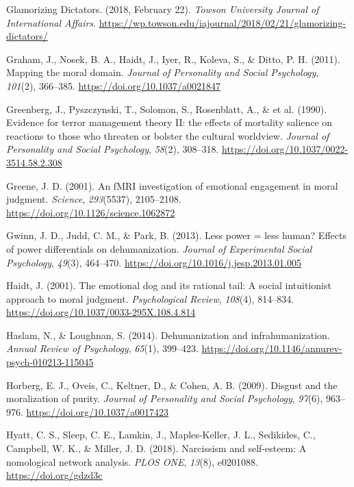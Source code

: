 \documentclass[
  donotrepeattitle,doc, 12pt, a4paper,floatsintext]{apa7}
\newlength{\cslhangindent}
\newlength{\cslentryspacingunit} %
\newenvironment{CSLReferences}[2] %
 {%
  \setlength{\parindent}{0pt}
  \ifodd #1
  \let\oldpar\par
  \def\par{\hangindent=\cslhangindent\oldpar}
  \fi
  \setlength{\parskip}{#2\cslentryspacingunit}
 }%
 {}
\begin{document}
\begin{CSLReferences}{1}{0}
\leavevmode{}%
Glamorizing Dictators. (2018, February 22). \emph{Towson University Journal of International Affairs}. \url{https://wp.towson.edu/iajournal/2018/02/21/glamorizing-dictators/}

\leavevmode{}%
Graham, J., Nosek, B. A., Haidt, J., Iyer, R., Koleva, S., \& Ditto, P. H. (2011). Mapping the moral domain. \emph{Journal of Personality and Social Psychology}, \emph{101}(2), 366--385. \url{https://doi.org/10.1037/a0021847}

\leavevmode{}%
Greenberg, J., Pyszczynski, T., Solomon, S., Rosenblatt, A., \& et al. (1990). Evidence for terror management theory II: the effects of mortality salience on reactions to those who threaten or bolster the cultural worldview. \emph{Journal of Personality and Social Psychology}, \emph{58}(2), 308--318. \url{https://doi.org/10.1037/0022-3514.58.2.308}

\leavevmode{}%
Greene, J. D. (2001). An fMRI investigation of emotional engagement in moral judgment. \emph{Science}, \emph{293}(5537), 2105--2108. \url{https://doi.org/10.1126/science.1062872}

\leavevmode{}%
Gwinn, J. D., Judd, C. M., \& Park, B. (2013). Less power = less human? Effects of power differentials on dehumanization. \emph{Journal of Experimental Social Psychology}, \emph{49}(3), 464--470. \url{https://doi.org/10.1016/j.jesp.2013.01.005}

\leavevmode{}%
Haidt, J. (2001). The emotional dog and its rational tail: A social intuitionist approach to moral judgment. \emph{Psychological Review}, \emph{108}(4), 814--834. \url{https://doi.org/10.1037/0033-295X.108.4.814}

\leavevmode{}%
Haslam, N., \& Loughnan, S. (2014). Dehumanization and infrahumanization. \emph{Annual Review of Psychology}, \emph{65}(1), 399--423. \url{https://doi.org/10.1146/annurev-psych-010213-115045}

\leavevmode{}%
Horberg, E. J., Oveis, C., Keltner, D., \& Cohen, A. B. (2009). Disgust and the moralization of purity. \emph{Journal of Personality and Social Psychology}, \emph{97}(6), 963--976. \url{https://doi.org/10.1037/a0017423}

\leavevmode{}%
Hyatt, C. S., Sleep, C. E., Lamkin, J., Maples-Keller, J. L., Sedikides, C., Campbell, W. K., \& Miller, J. D. (2018). Narcissism and self-esteem: A nomological network analysis. \emph{PLOS ONE}, \emph{13}(8), e0201088. \url{https://doi.org/gdzd3c}


\end{CSLReferences}
\end{document}
